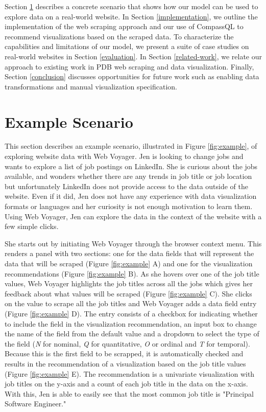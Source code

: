 \documentclass{vgtc}                          %
\begin{document}
Section \ref{demo} describes a concrete scenario that shows how our model can be used to explore data on a real-world website.
In Section \ref{implementation}, we outline the implementation of the web scraping approach and our use of CompassQL to recommend
visualizations based on the scraped data. To characterize the capabilities and limitations of our model, we present a suite of
case studies on real-world websites in Section \ref{evaluation}. In Section \ref{related-work}, we relate our approach to existing
work in PDB web scraping and data visualization. Finally, Section \ref{conclusion} discusses opportunities for future work such
as enabling data transformations and manual visualization specification.

\section{Example Scenario} \label{demo}

This section describes an example scenario, illustrated in Figure \ref{fig:example}, of exploring website data with Web Voyager.
Jen is looking to change jobs and wants to explore a list of job postings on LinkedIn. She is curious about the jobs available, and
wonders whether there are any trends in job title or job location but unfortunately LinkedIn does not provide access to the data outside
of the website. Even if it did, Jen does not have any experience with data visualization formats or languages and her curiosity is not enough
motivation to learn them. Using Web Voyager, Jen can explore the data in the context of the website with a few simple clicks.

She starts out by initiating Web Voyager through the browser context menu. This renders a panel with two sections: one for the data fields
that will represent the data that will be scraped (Figure \ref{fig:example} A) and one for the visualization recommendations (Figure \ref{fig:example} B).
As she hovers over one of the job title values, Web Voyager highlights the job titles across all the jobs which gives her feedback about what values will
be scraped (Figure \ref{fig:example} C). She clicks on the value to scrape all the job titles and Web Voyager adds a data field entry (Figure \ref{fig:example} D). 
The entry consists of a checkbox for indicating whether to include the field in the visualization recommendation, an input box to change the name of the field
from the default value and a dropdown to select the type of the field (\emph{N} for nominal, \emph{Q} for quantitative, \emph{O} or ordinal and \emph{T} for temporal).
Because this is the first field to be scrapped, it is automatically checked and results in the recommendation of a visualization
based on the job title values (Figure \ref{fig:example} E). The recommendation is a univariate visualization with job titles on the y-axis and a count of each job title in the data on the x-axis.
With this, Jen is able to easily see that the most common job title is "Principal Software Engineer."
\end{document}
